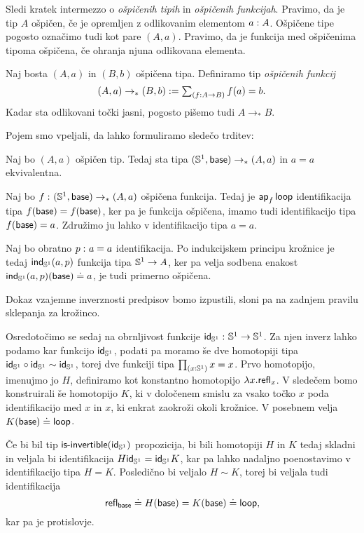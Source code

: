 Sledi kratek intermezzo o \emph{ošpičenih tipih} in \emph{ošpičenih funkcijah}.
Pravimo, da je tip \(A\) ošpičen, če je opremljen z odlikovanim elementom \(a : A\). Ošpičene tipe pogosto označimo tudi kot pare \((A, a)\). Pravimo, da je funkcija med ošpičenima tipoma ošpičena, če ohranja njuna odlikovana elementa.
\begin{definicija}
  Naj bosta \((A, a)\) in \((B, b)\) ošpičena tipa. Definiramo tip \emph{ošpičenih funkcij}
  \[(A, a) \to_{\ast} (B, b) := \textstyle \sum_{\left( f : A \to B \right)} f(a) = b.\]
  Kadar sta odlikovani točki jasni, pogosto pišemo tudi \(A \to_{\ast} B\).
\end{definicija}

Pojem smo vpeljali, da lahko formuliramo sledečo trditev:
\begin{trditev}
  \label{circle-loop-space}
  Naj bo \((A, a)\) ošpičen tip. Tedaj sta tipa \((\mathbb{S}^{1}, \textnormal{\textsf{base}}) \to_{\ast} (A, a)\) in \(a = a\) ekvivalentna.
\end{trditev}

\begin{dokaz}
  Naj bo \(f \,\colon (\mathbb{S}^{1}, \textnormal{\textsf{base}}) \to_{\ast} (A, a)\) ošpičena funkcija. Tedaj je \(\textnormal{\textsf{ap}}_{f}\, \textnormal{\textsf{loop}}\) identifikacija tipa \(f(\textnormal{\textsf{base}}) = f(\textnormal{\textsf{base}})\), ker pa je funkcija ošpičena, imamo tudi identifikacijo tipa \(f(\textnormal{\textsf{base}}) = a\). Združimo ju lahko v identifikacijo tipa \(a = a\).

  Naj bo obratno \(p \,\colon a = a\) identifikacija. Po indukcijskem principu krožnice je tedaj \(\textnormal{\textsf{ind}}_{\mathbb{S}^{1}}(a, p)\) funkcija tipa \(\mathbb{S}^{1} \to A\), ker pa velja sodbena enakost \(\textnormal{\textsf{ind}}_{\mathbb{S}^{1}}(a, p)(\textnormal{\textsf{base}}) \doteq a\), je tudi primerno ošpičena.

  Dokaz vzajemne inverznosti predpisov bomo izpustili, sloni pa na zadnjem pravilu sklepanja za krožinco.
\end{dokaz}

Osredotočimo se sedaj na obrnljivost funkcije \(\textnormal{\textsf{id}}_{\mathbb{S}^{1}} \,\colon \mathbb{S}^{1} \to \mathbb{S}^{1}\). Za njen inverz lahko podamo kar funkcijo \(\textnormal{\textsf{id}}_{\mathbb{S}^{1}}\), podati pa moramo še dve homotopiji tipa \(\textnormal{\textsf{id}}_{\mathbb{S}^{1}} \circ \textnormal{\textsf{id}}_{\mathbb{S}^{1}} \sim \textnormal{\textsf{id}}_{\mathbb{S}^{1}}\), torej dve funkciji tipa \(\textstyle \prod_{\left( x : \mathbb{S}^{1} \right)} x = x\). Prvo homotopijo, imenujmo jo \(H\), definiramo kot konstantno homotopijo \(\lambda x.\textnormal{\textsf{refl}}_{x}\). V sledečem bomo konstruirali še homotopijo \(K\), ki v določenem smislu za vsako točko \(x\) poda identifikacijo med \(x\) in \(x\), ki enkrat zaokroži okoli krožnice. V posebnem velja \(K(\textnormal{\textsf{base}}) \doteq \textnormal{\textsf{loop}}\).

Če bi bil tip \(\textnormal{\textsf{is-invertible}}(\textnormal{\textsf{id}}_{\mathbb{S}^{1}})\) propozicija, bi bili homotopiji \(H\) in \(K\) tedaj skladni in veljala bi identifikacija \(H\textnormal{\textsf{id}}_{\mathbb{S}^{1}} = \textnormal{\textsf{id}}_{\mathbb{S}^{1}}K\), kar pa lahko nadaljno poenostavimo v identifikacijo tipa \(H = K\). Posledično bi veljalo \(H \sim K\), torej bi veljala tudi identifikacija
\[\textnormal{\textsf{refl}}_{\textnormal{\textsf{base}}} \doteq H(\textnormal{\textsf{base}}) = K(\textnormal{\textsf{base}}) \doteq \textnormal{\textsf{loop}},\]
kar pa je protislovje.

